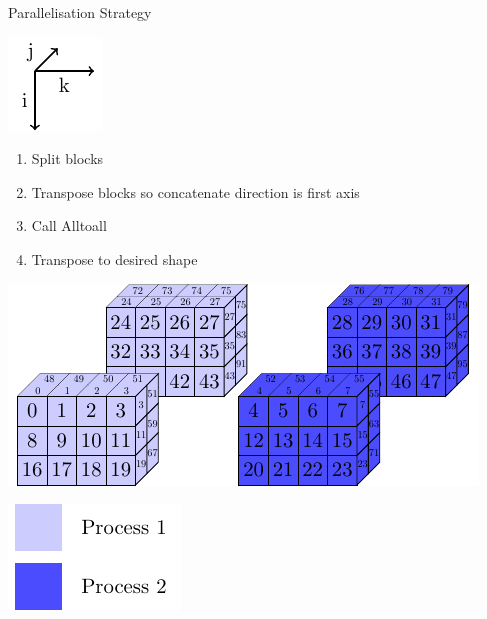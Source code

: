 \documentclass{beamer}
\begin{document}
\begin{frame}{Parallelisation Strategy}
 \begin{minipage}{.3\textwidth}
 \includegraphics[width=.4\textwidth]{SplitConcat3D/Axes}
 \vspace{1em}
 
  \begin{enumerate}
   \item Split blocks 
   \item Transpose blocks so concatenate direction is first axis
   \item Call Alltoall
   \item Transpose to desired shape
  \end{enumerate}
  
  \vspace{1em}
 \end{minipage}
 \begin{minipage}{.65\textwidth}
  \includegraphics[width=\textwidth]{SplitConcat3D/RightRecv}
  
  \vspace{1em}
  
  \hfill\includegraphics[width=.3\textwidth]{SplitConcat3D/Legend}
 \end{minipage}
\end{frame}
\end{document}
